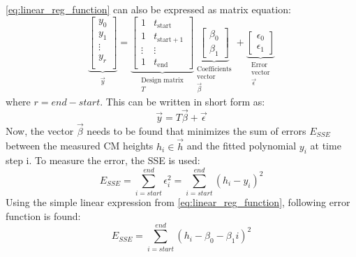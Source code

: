\autoref{eq:linear_reg_function} can also be expressed as matrix equation:
\begin{equation}\label{eq:linear_reg_matrix}
    \underbrace{
    \begin{bmatrix}
        y_0\\
        y_1\\
        \vdots\\
        y_r\\
    \end{bmatrix}}_{\substack{\vec{y}}}
    =
    \underbrace{
    \begin{bmatrix}
        1 & t_{\text{start}}\\
        1 & t_{\text{start} + 1}\\
        \vdots & \vdots\\
        1 & t_{\text{end}}
    \end{bmatrix}}_{\substack{\text{Design matrix} \\ T}}
    \underbrace{
    \begin{bmatrix}
        \beta_0\\
        \beta_1
    \end{bmatrix}}_{\substack{\text{Coefficients} \\ \text{vector} \\
    \vec{\beta}}}
    +
    \underbrace{
    \begin{bmatrix}
        \epsilon_0\\
        \epsilon_1
    \end{bmatrix}}_{\substack{\text{Error} \\ \text{vector} \\
    \vec{\epsilon}}}
\end{equation}
where $r = end - start$.
This can be written in short form as:
\[
    \vec{y} = T\vec{\beta} + \vec{\epsilon}    
\]
Now, the vector $\vec{\beta}$ needs to be found that minimizes the sum of
errors $E_{SSE}$ between the measured \ac{CM} heights $h_i \in \vec{h}$ and
the fitted polynomial $y_i$ at time step i.
To measure the error, the \ac{SSE} is used:
\begin{equation}
    E_{SSE} = \sum_{i=start}^{end} \epsilon_i^2 = \sum_{i=start}^{end} (h_i - y_i)^2
\end{equation}
Using the simple linear expression from \autoref{eq:linear_reg_function},
following error function is found:
\begin{equation}
    E_{SSE} = \sum_{i=start}^{end} (h_i - \beta_0 - \beta_1i)^2
\end{equation}
